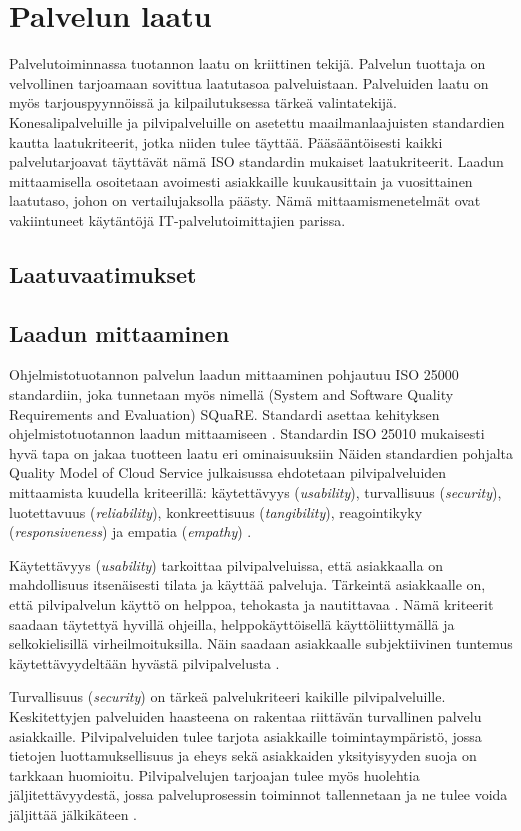 \chapter{Palvelun laatu\label{laatu}}
Palvelutoiminnassa tuotannon laatu on kriittinen tekijä. Palvelun tuottaja on velvollinen tarjoamaan sovittua laatutasoa palveluistaan. Palveluiden laatu on myös tarjouspyynnöissä ja kilpailutuksessa tärkeä valintatekijä. Konesalipalveluille ja pilvipalveluille on asetettu maailmanlaajuisten standardien kautta laatukriteerit, jotka niiden tulee täyttää. Pääsääntöisesti kaikki palvelutarjoavat täyttävät nämä ISO standardin mukaiset laatukriteerit. Laadun mittaamisella osoitetaan avoimesti asiakkaille kuukausittain ja vuosittainen laatutaso, johon on vertailujaksolla päästy. Nämä mittaamismenetelmät ovat vakiintuneet käytäntöjä IT-palvelutoimittajien parissa.
\section{Laatuvaatimukset}
\section{Laadun mittaaminen}
Ohjelmistotuotannon palvelun laadun mittaaminen pohjautuu ISO 25000 standardiin, joka tunnetaan myös nimellä (System and Software Quality Requirements and Evaluation) SQuaRE. Standardi asettaa kehityksen ohjelmistotuotannon laadun mittaamiseen \citep{iso25000}.  Standardin ISO 25010 mukaisesti hyvä tapa on jakaa tuotteen laatu eri ominaisuuksiin \citep{iso25010} Näiden standardien pohjalta Quality Model of Cloud Service julkaisussa ehdotetaan pilvipalveluiden mittaamista kuudella kriteerillä: käytettävyys (\emph{usability}), turvallisuus (\emph{security}), luotettavuus (\emph{reliability}), konkreettisuus (\emph{tangibility}), reagointikyky (\emph{responsiveness}) ja empatia (\emph{empathy}) \citep{qualitymodel}.

Käytettävyys (\emph{usability}) tarkoittaa pilvipalveluissa, että asiakkaalla on mahdollisuus itsenäisesti tilata ja käyttää palveluja. Tärkeintä asiakkaalle on, että pilvipalvelun käyttö on helppoa, tehokasta ja nautittavaa \citep{adaptive}. Nämä kriteerit saadaan täytettyä hyvillä ohjeilla, helppokäyttöisellä käyttöliittymällä ja selkokielisillä virheilmoituksilla. Näin saadaan asiakkaalle subjektiivinen tuntemus käytettävyydeltään hyvästä pilvipalvelusta \citep{qualitymodel}.

Turvallisuus (\emph{security}) on tärkeä palvelukriteeri kaikille pilvipalveluille. Keskitettyjen palveluiden haasteena on rakentaa riittävän turvallinen palvelu asiakkaille. Pilvipalveluiden tulee tarjota asiakkaille toimintaympäristö, jossa tietojen luottamuksellisuus ja eheys sekä asiakkaiden yksityisyyden suoja on tarkkaan huomioitu. Pilvipalvelujen tarjoajan tulee myös huolehtia jäljitettävyydestä, jossa palveluprosessin toiminnot tallennetaan ja ne tulee voida jäljittää jälkikäteen \citep{qualitymodel}.

